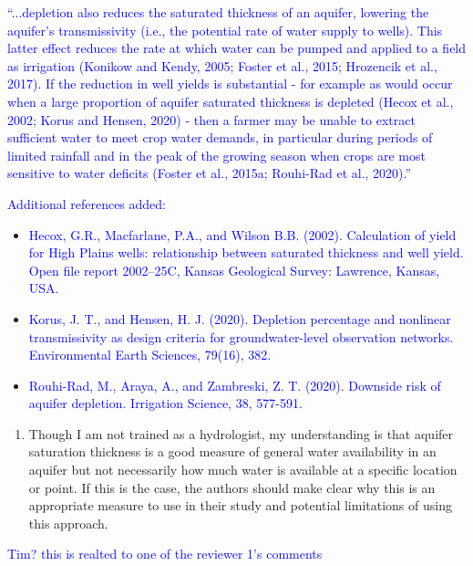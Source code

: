 \documentclass[
]{article}
\providecommand{\tightlist}{%
  \setlength{\itemsep}{0pt}\setlength{\parskip}{0pt}}
\begin{document}
\textcolor{blue}{``...depletion also reduces the saturated thickness of an aquifer, lowering the aquifer's transmissivity (i.e., the potential rate of water supply to wells). This latter effect reduces the rate at which water can be pumped and applied to a field as irrigation (Konikow and Kendy, 2005; Foster et al., 2015; Hrozencik et al., 2017). If the reduction in well yields is substantial - for example as would occur when a large proportion of aquifer saturated thickness is depleted (Hecox et al., 2002; Korus and Hensen, 2020) - then a farmer may be unable to extract sufficient water to meet crop water demands, in particular during periods of limited rainfall and in the peak of the growing season when crops are most sensitive to water deficits (Foster et al., 2015a; Rouhi-Rad et al., 2020).''
}

\textcolor{blue}{Additional references added:}

\begin{itemize}
\item
  \textcolor{blue}{Hecox, G.R., Macfarlane, P.A., and Wilson B.B. (2002). Calculation of yield for High Plains wells: relationship between saturated thickness and well yield. Open file report 2002–25C, Kansas Geological Survey: Lawrence, Kansas, USA.}
\item
  \textcolor{blue}{Korus, J. T., and Hensen, H. J. (2020). Depletion percentage and nonlinear transmissivity as design criteria for groundwater-level observation networks. Environmental Earth Sciences, 79(16), 382.}
\item
  \textcolor{blue}{Rouhi-Rad, M., Araya, A., and Zambreski, Z. T. (2020). Downside risk of aquifer depletion. Irrigation Science, 38, 577-591.}
\end{itemize}

\begin{enumerate}
\def\labelenumi{\arabic{enumi}.}
\setcounter{enumi}{1}
\tightlist
\item
  Though I am not trained as a hydrologist, my understanding is that
  aquifer saturation thickness is a good measure of general water
  availability in an aquifer but not necessarily how much water is
  available at a specific location or point. If this is the case, the
  authors should make clear why this is an appropriate measure to use in
  their study and potential limitations of using this approach.
\end{enumerate}

\textcolor{blue}{Tim? this is realted to one of the reviewer 1's comments}
\end{document}
